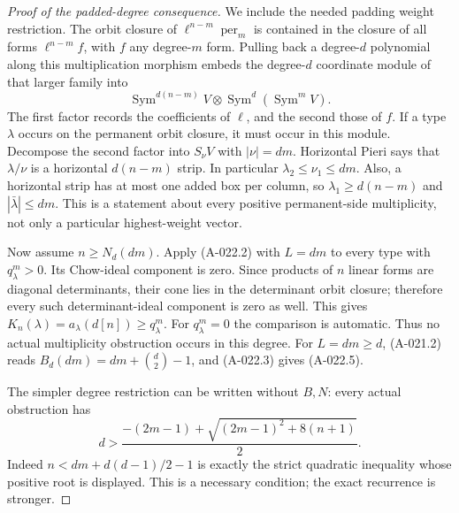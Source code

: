 \begin{proof}[Proof of the padded-degree consequence]
We include the needed padding weight restriction. The orbit
closure of $\ell^{n-m}\operatorname{per}_m$ is contained in the
closure of all forms $\ell^{n-m}f$, with $f$ any degree-$m$
form. Pulling back a degree-$d$ polynomial along this
multiplication morphism embeds the degree-$d$ coordinate
module of that larger family into
\[
          \operatorname{Sym}^{d(n-m)}V\otimes
                         \operatorname{Sym}^d(\operatorname{Sym}^mV).
\]
The first factor records the coefficients of $\ell$, and the
second those of $f$. If a type $\lambda$ occurs on the
permanent orbit closure, it must occur in this module.
Decompose the second factor into $S_\nu V$ with $|\nu|=dm$.
Horizontal Pieri says that $\lambda/\nu$ is a horizontal
$d(n-m)$ strip. In particular $\lambda_2\leq\nu_1\leq dm$.
Also, a horizontal strip has at most one added box per column,
so $\lambda_1\geq d(n-m)$ and $|\bar\lambda|\leq dm$.
This is a statement about every
positive permanent-side multiplicity, not only a particular
highest-weight vector.

Now assume $n\geq N_d(dm)$. Apply (A-022.2) with $L=dm$
to every type with $q^m_\lambda>0$. Its Chow-ideal component
is zero. Since products of $n$ linear forms are diagonal
determinants, their cone lies in the determinant orbit closure;
therefore every such determinant-ideal component is zero as
well. This gives $K_n(\lambda)=a_\lambda(d[n])\geq q^m_\lambda$.
For $q^m_\lambda=0$ the comparison is automatic. Thus no
actual multiplicity obstruction occurs in this degree.
For $L=dm\geq d$, (A-021.2) reads
$B_d(dm)=dm+\binom d2-1$, and (A-022.3) gives (A-022.5).

The simpler degree restriction can be written without $B,N$:
every actual obstruction has
\[
 d>
 \frac{-(2m-1)+\sqrt{(2m-1)^2+8(n+1)}}{2}.              \tag{A-022.10}
\]
Indeed $n<dm+d(d-1)/2-1$ is exactly the strict quadratic
inequality whose positive root is displayed. This is a
necessary condition; the exact recurrence is stronger.
\end{proof}

